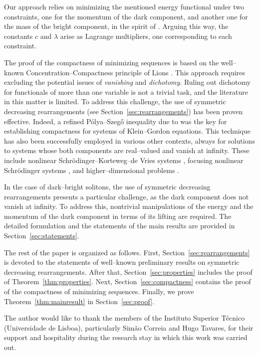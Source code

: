 \documentclass[11pt]{article}
\theoremstyle{plain}
\theoremstyle{definition}
\theoremstyle{remark}
\numberwithin{equation}{section}
\begin{document}
{{Our approach relies on minimizing the mentioned} energy functional under two constraints, one for the momentum of the dark component, and another one for the mass of the bright component, in the spirit of \cite{alhelou}. Arguing this way, the constants $c$ and $\lambda$ arise as Lagrange multipliers, one corresponding to each constraint. 

The proof of the compactness of minimizing sequences is based on the well--known Concentration--Compactness principle of Lions \cite{CCPLionsI,CCPLionsII}. This approach requires excluding the potential issues of \emph{vanishing} and \emph{dichotomy}. Ruling out dichotomy for functionals of more than one variable is not a trivial task, and the literature in this matter is limited. To address this challenge, the use of symmetric decreasing rearrangements (see Section~\ref{sec:rearrangements}) has been proven effective. Indeed, a refined P\'olya--Szeg\H{o} inequality due to \cite{Garrisi} was the key for establishing compactness for {systems} of Klein--Gordon equations. This technique has also been successfully employed in various other contexts, always for solutions to systems whose both components are real--valued and vanish at infinity. These include nonlinear Schr\"odinger--Korteweg--de Vries systems \cite{Albert_Bhattarai}, focusing nonlinear Schr\"odinger systems \cite{Nguyen_Wang}, and higher--dimensional problems \cite{Shibata,GouJeanjean2016,GouJeanjean2018}. 

In the case of dark--bright solitons, the use of symmetric decreasing rearrangements presents a particular challenge, as the dark component does not vanish at infinity. To address this, nontrivial manipulations of the energy and the momentum of the dark component in terms of its lifting are required. The detailed formulation and the statements of the main results are provided in Section~\ref{sec:statements}. 

The rest of the paper is organized as follows. First, Section~\ref{sec:rearrangements} is devoted to the statements of well--known preliminary results on symmetric decreasing rearrangements. After that, Section~\ref{sec:properties} includes the proof of Theorem~\ref{thm:properties}. Next, Section~\ref{sec:compactness} contains the proof of the compactness of minimizing sequences. Finally, we prove Theorem~\ref{thm:mainresult} in Section~\ref{sec:proof}.

\medskip

 The author would like to thank the members of the Instituto Superior T\'ecnico (Universidade de Lisboa), particularly Sim\~ao Correia and Hugo Tavares, for their support and hospitality during the research stay in which this work was carried out.

}
\end{document}

